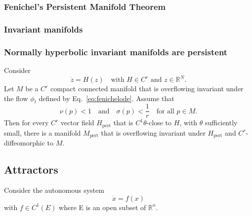 \documentclass{article}
\newcommand{\reals}{\mathbb{R}}
\newcounter{ct}
\begin{document}
\subsubsection{Fenichel's Persistent Manifold Theorem}\label{sec:fenichel}

\subsubsection{Invariant manifolds}\label{sec:invman}
 \citep{roberts1989invariant,
kalitin2021attractors}

 \citep{hirsch1970invariant}
 \citep{wiggins1994nhim}
 \citep{jones1995gspt}
 \citep{kuehn2015multipletimescale}


\subsubsection{Normally hyperbolic invariant manifolds are persistent}
\begin{theorem}
 Consider
\begin{equation}\label{eq:fenichelode}
\dot{z} = H(z) \quad \text{with } H \in C^r \text{ and } z \in \mathbb{R}^N. 
\end{equation}
Let \( M \) be a \( C^r \) compact connected manifold that is overflowing invariant under the flow \( \phi_t \) defined by Eq.~\ref{eq:fenichelode}. Assume that
\begin{equation}
\nu(p) < 1 \quad \text{and} \quad \sigma(p) < \frac{1}{r} \quad \text{for all } p \in M. 
\end{equation}
Then for every \( C^r \) vector field \( H_{\text{pert}} \) that is \( C^1 \theta \)-close to \( H \), with \( \theta \) sufficiently small, there is a manifold \( M_{\text{pert}} \) that is overflowing invariant under \( H_{\text{pert}} \) and \( C^r \)-diffeomorphic to \( M \).
\end{theorem}




\subsection{Attractors}\label{sec:attractors}
Consider the autonomous system
\begin{equation}\label{eq:attractorode}
\dot x = f(x)
\end{equation}
with \(f \in C^1(E)\) where E is an open subset of \(\reals^n\). 
\end{document}
